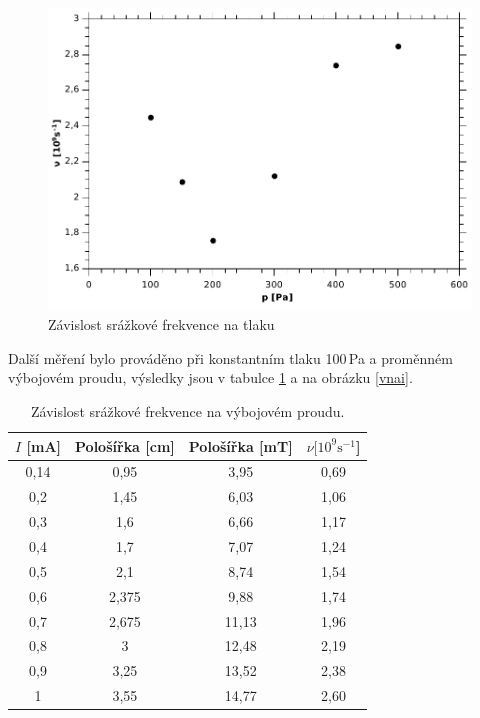 \documentclass[12pt]{article}
\begin{document}
\begin{figure}[!htbp]
\begin{center}
\includegraphics[width=12cm]{Graph3.pdf}
\caption{Závislost srážkové frekvence na tlaku}
\label{vnap}
\end{center}
\end{figure}

Další měření bylo prováděno při konstantním tlaku 100\,Pa a proměnném výbojovém proudu, výsledky jsou v tabulce \ref{t2} a na obrázku \ref{vnai}.

\begin{table}[htbp]
\begin{center}
\begin{tabular}{|c|c|c|c|}
\hline
$I$ [mA] & Pološířka [cm] & Pološířka [mT] & $\nu [10^9 \mathrm{s}^{-1}$] \\ \hline
0,14 & 0,95 & 3,95 & 0,69 \\ \hline
0,2 & 1,45 & 6,03 & 1,06 \\ \hline
0,3 & 1,6 & 6,66 & 1,17 \\ \hline
0,4 & 1,7 & 7,07 & 1,24 \\ \hline
0,5 & 2,1 & 8,74 & 1,54 \\ \hline
0,6 & 2,375 & 9,88 & 1,74 \\ \hline
0,7 & 2,675 & 11,13 & 1,96 \\ \hline
0,8 & 3 & 12,48 & 2,19 \\ \hline
0,9 & 3,25 & 13,52 & 2,38 \\ \hline
1 & 3,55 & 14,77 & 2,60 \\ \hline
\end{tabular}
\end{center}
\caption{Závislost srážkové frekvence na výbojovém proudu.}
\label{t2}
\end{table}
\end{document}

